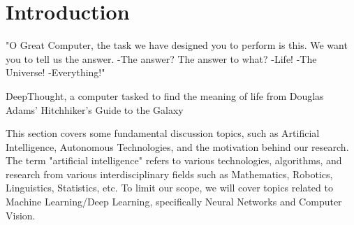 \chapter{Introduction}
\epigraph{"O Great Computer, the task we have designed you to perform is this. We want you to tell us the answer. -The answer? The answer to what? -Life! -The Universe! -Everything!"}{DeepThought, a computer tasked to find the meaning of life from Douglas Adams' Hitchhiker's Guide to the Galaxy}
This section covers some fundamental discussion topics, such as Artificial Intelligence, Autonomous Technologies, and the motivation behind our research. The term "artificial intelligence" refers to various technologies, algorithms, and research from various interdisciplinary fields such as Mathematics, Robotics, Linguistics, Statistics, etc. To limit our scope, we will cover topics related to Machine Learning/Deep Learning, specifically Neural Networks and Computer Vision. 



